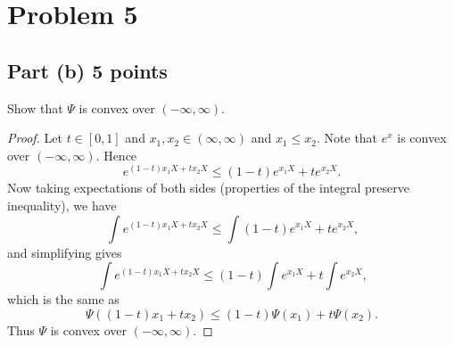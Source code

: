 \documentclass[letterpaper, 12pt]{article}
\begin{document}
\section*{Problem 5}
\subsection*{Part (b) 5 points}
Show that $\Psi$ is convex over $(-\infty,\infty)$.
\begin{proof}
Let $t \in [0,1]$ and $x_1, x_2 \in (\infty, \infty)$ and $x_1 \leq x_2$. Note that $e^x$ is convex over $(-\infty,\infty)$. Hence 
\[
\displaystyle
e^{(1-t) x_1 X+ t x_2 X} \leq (1-t)e^{x_1 X} + t e^{x_2 X}
\text{.}
\]
Now taking expectations of both sides (properties of the integral preserve inequality), we have
\[
\int e^{(1-t) x_1 X + t x_2 X} \leq \int (1-t)e^{x_1 X} + t e^{x_2 X}
\text{,}
\]
and simplifying gives
\[
\int e^{(1-t) x_1 X + t x_2 X} \leq (1-t) \int e^{x_1 X} + t \int e^{x_2 X}
\text{,}
\]
which is the same as
\[
\Psi((1-t) x_1  + t x_2 ) \leq (1-t)\Psi(x_1) + t \Psi(x_2)
\text{.}
\]
Thus $\Psi$ is convex over $(-\infty, \infty)$.
\end{proof}
\pagebreak

\end{document}
